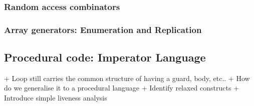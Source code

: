 \documentclass[preamble.tex]{subfiles}
\begin{document}


\subsubsection{Random access combinators}



\subsubsection{Array generators: Enumeration and Replication}



\subsection{Procedural code: Imperator Language}

+ Loop still carries the common structure of having a guard, body, etc..
+ How do we generalise it to a procedural language
+ Identify relaxed constructs
+ Introduce simple liveness analysis
\end{document}
